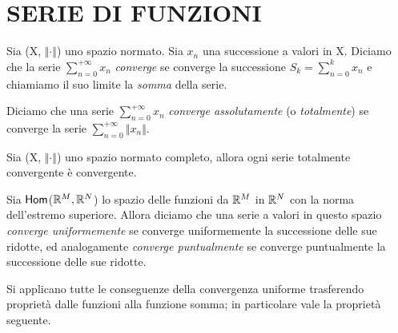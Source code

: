 \documentclass[Completo.tex]{subfiles}
\begin{document}
\section{SERIE DI FUNZIONI}
\begin{Def}
	Sia (X, $\Vert \cdot \Vert$) uno spazio normato. Sia $x_n$ una successione a valori in X. Diciamo che la serie $\sum_{n = 0}^{+\infty} x_n$ \textit{converge} se converge la successione $S_k = \sum_{n=0}^{k} x_n$ e chiamiamo il suo limite la \textit{somma} della serie.
\end{Def}
\begin{Def}
	Diciamo che una serie $\sum_{n = 0}^{+\infty} x_n$  \textit{converge assolutamente} (o \textit{totalmente}) se converge la serie $\sum_{n = 0}^{+\infty} \Vert x_n \Vert$.
\end{Def}
\begin{eTh}
	Sia (X, $\Vert \cdot \Vert$) uno spazio normato completo, allora ogni serie totalmente convergente è convergente.
\end{eTh}
\begin{Def}
	Sia $\sf[Hom]$($\bb[R]^{M}, \bb[R]^{N}$) lo spazio delle funzioni da $\bb[R]^{M}$ in $\bb[R]^{N}$ con la norma dell'estremo superiore. Allora diciamo che una serie a valori in questo spazio \textit{converge uniformemente} se converge uniformemente la successione delle sue ridotte, ed analogamente \textit{converge puntualmente} se converge puntualmente la successione delle sue ridotte.
\end{Def}
\begin{Oss}
	Si applicano tutte le conseguenze della convergenza uniforme trasferendo proprietà dalle funzioni alla funzione somma; in particolare vale la proprietà seguente.
\end{Oss}
\end{document}

